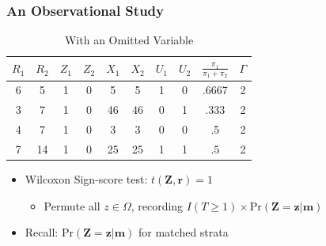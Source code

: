 \documentclass{beamer}
\begin{document}
\begin{frame}[c]\frametitle{An Observational Study}
	\begin{table}
		\begin{center}
			\begin{tabular}{cccccccccc}
				$R_1$ & $R_2$ & $Z_1$ & $Z_2$ & $X_1$ & $X_2$ & $U_1$ & $U_2$ & $\frac{\pi_1}{\pi_1 + \pi_2}$ & $\Gamma $\\ \hline
				6 & 5 & 1 & 0 & 5 & 5 & 1 & 0 &  .6667 &2 \\
				3 & 7 & 1 & 0 & 46 & 46 & 0 & 1 & .333 &2 \\
				4 & 7 & 1 & 0 & 3 & 3 & 0 & 0 &  .5 & 2\\
				7 & 14 & 1 & 0 & 25 &25 & 1 & 1 & .5 & 2 \\
			\end{tabular}
		\end{center}
		\caption{With an Omitted Variable}
	\end{table}
\begin{itemize}
\item[] Wilcoxon Sign-score test: $t(\mathbf{Z},\mathbf{r}) = 1$
\begin{itemize}
\item Permute all $z\in\Omega$, recording $I(T\geq
  1)\times\text{Pr}(\mathbf{Z}=\mathbf{z}|\mathbf{m})$
\end{itemize}
\vspace{.25em}
\item[] Recall: $\text{Pr}(\mathbf{Z}=\mathbf{z}|\mathbf{m})$ for
  matched strata%
\end{itemize}
\end{frame}


\end{document}

